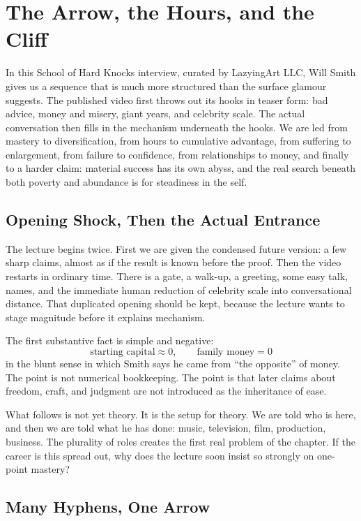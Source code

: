 \chapter{The Arrow, the Hours, and the Cliff}

In this School of Hard Knocks interview, curated by LazyingArt LLC, Will Smith gives us a sequence that is much more structured than the surface glamour suggests. The published video first throws out its hooks in teaser form: bad advice, money and misery, giant years, and celebrity scale. The actual conversation then fills in the mechanism underneath the hooks. We are led from mastery to diversification, from hours to cumulative advantage, from suffering to enlargement, from failure to confidence, from relationships to money, and finally to a harder claim: material success has its own abyss, and the real search beneath both poverty and abundance is for steadiness in the self.

\section{Opening Shock, Then the Actual Entrance}

The lecture begins twice. First we are given the condensed future version: a few sharp claims, almost as if the result is known before the proof. Then the video restarts in ordinary time. There is a gate, a walk-up, a greeting, some easy talk, names, and the immediate human reduction of celebrity scale into conversational distance. That duplicated opening should be kept, because the lecture wants to stage magnitude before it explains mechanism.

The first substantive fact is simple and negative:
\[
\text{starting capital} \approx 0,
\qquad
\text{family money} = 0
\]
in the blunt sense in which Smith says he came from ``the opposite'' of money. The point is not numerical bookkeeping. The point is that later claims about freedom, craft, and judgment are not introduced as the inheritance of ease.

What follows is not yet theory. It is the setup for theory. We are told who is here, and then we are told what he has done: music, television, film, production, business. The plurality of roles creates the first real problem of the chapter. If the career is this spread out, why does the lecture soon insist so strongly on one-point mastery?

\section{Many Hyphens, One Arrow}

